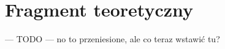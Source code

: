 \chapter{Fragment teoretyczny}\label{ch:fragment-teoretyczny}


--- TODO --- no to przeniesione, ale co teraz wstawić tu?